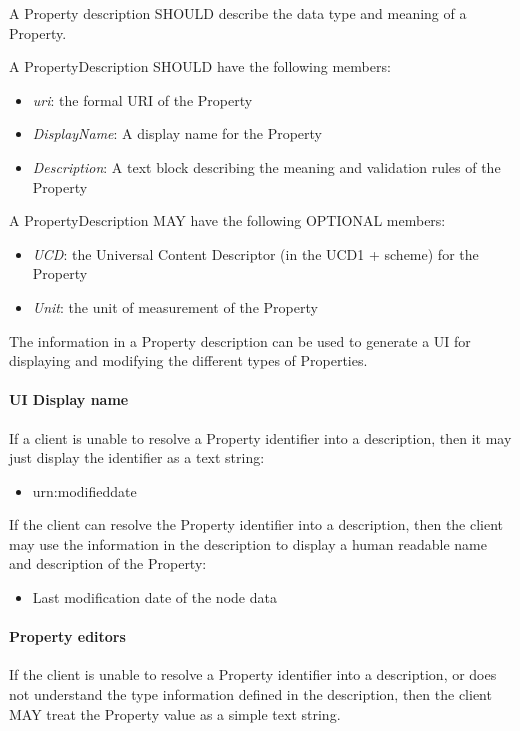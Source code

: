 \documentclass[11pt,a4paper]{ivoa}
\begin{document}
A Property description SHOULD describe the data type and meaning of a Property.

A PropertyDescription SHOULD have the following members:

\begin{itemize}
    \item \emph{uri}: the formal URI of the Property
    \item \emph{DisplayName}: A display name for the Property
    \item \emph{Description}: A text block describing the meaning and validation rules of the Property
\end{itemize}

A PropertyDescription MAY have the following OPTIONAL members:

\begin{itemize}
    \item \emph{UCD}: the Universal Content Descriptor (in the UCD1 + scheme) for the Property
    \item \emph{Unit}: the unit of measurement of the Property
\end{itemize}

The information in a Property description can be used to generate a UI for displaying and modifying the different types of Properties.

\paragraph{UI Display name}
If a client is unable to resolve a Property identifier into a description, then it may just display the identifier as a text string:

\begin{itemize}
    \item urn:modifieddate
\end{itemize}

If the client can resolve the Property identifier into a description, then the client may use the information in the description to display a human readable name and description of the Property:

\begin{itemize}
    \item Last modification date of the node data
\end{itemize}

\paragraph{Property editors}
If the client is unable to resolve a Property identifier into a description, or does not understand the type information defined in the description, then the client MAY treat the Property value as a simple text string.
\end{document}
